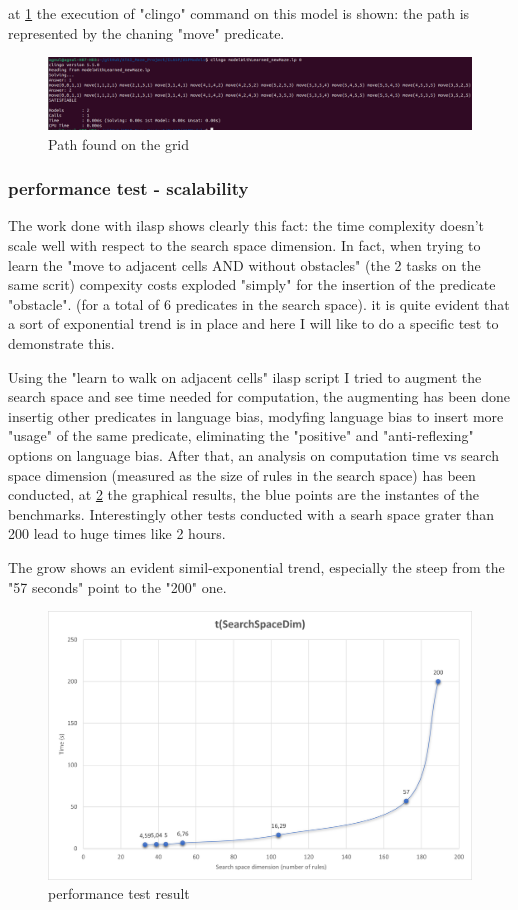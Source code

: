 at \ref{fig:asd3} the execution of "clingo" command on this model is shown: the path is represented by the chaning "move" predicate.

\newpage
\begin{figure}
	\includegraphics[scale=0.3]{img/outputModel_newMaze.png}
	\caption{Path found on the grid}\label{fig:asd3}
\end{figure}

\subsubsection{performance test - scalability}
The work done with ilasp shows clearly this fact: the time complexity doesn't scale well with respect to the search space dimension. In fact, when trying to learn the "move to adjacent cells AND without obstacles" (the 2 tasks on the same scrit) compexity costs exploded "simply" for the insertion of the predicate "obstacle". (for a total of 6 predicates in the search space). it is quite evident that a sort of exponential trend is in place and here I will like to do a specific test to demonstrate this.

Using the "learn to walk on adjacent cells" ilasp script I tried to augment the search space and see time needed for computation, the augmenting has been done insertig other predicates in language bias, modyfing language bias to insert more "usage" of the same predicate, eliminating the "positive" and "anti-reflexing" options on language bias. After that, an analysis on computation time vs search space dimension (measured as the size of rules in the search space) has been conducted, at \ref{fig:asd4} the graphical results, the blue points are the instantes of the benchmarks. Interestingly other tests conducted with a searh space grater than 200 lead to huge times like 2 hours.

The grow shows an evident simil-exponential trend, especially the steep from the "57 seconds" point to the "200" one.
\newpage

\begin{figure}
	\centering
	\includegraphics[scale=0.7]{img/GraphTimes.png}
	\caption{performance test result}\label{fig:asd4}
\end{figure}



\newpage
